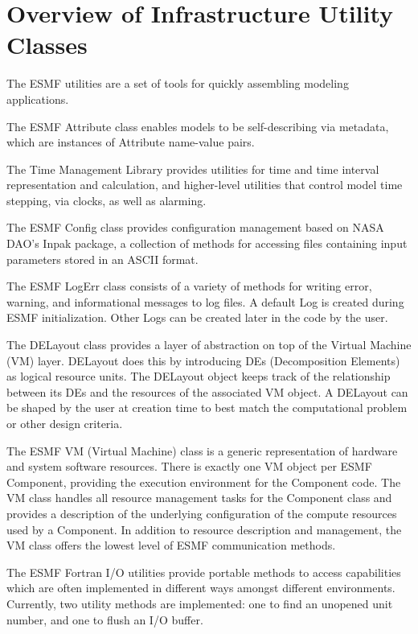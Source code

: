 %

\section{Overview of Infrastructure Utility Classes}

The ESMF utilities are a set of tools for quickly assembling modeling applications.

The ESMF Attribute class enables models to be self-describing via metadata, which are instances of Attribute name-value pairs.

The Time Management Library provides utilities for time and time interval representation and calculation, and higher-level utilities that control model time stepping, via clocks, as well as alarming.

The ESMF Config class provides configuration management based on NASA DAO's Inpak package, a collection of methods for accessing files containing input parameters stored in an ASCII format.

The ESMF LogErr class consists of a variety of methods for writing error, warning, and informational messages to log files. A default Log is created during ESMF initialization. Other Logs can be created later in the code by the user.

The DELayout class provides a layer of abstraction on top of the Virtual Machine (VM) layer. DELayout does this by introducing DEs (Decomposition Elements) as logical resource units. The DELayout object keeps track of the relationship between its DEs and the resources of the associated VM object. A DELayout can be shaped by the user at creation time to best match the computational problem or other design criteria.

The ESMF VM (Virtual Machine) class is a generic representation of hardware and system software resources. There is exactly one VM object per ESMF Component, providing the execution environment for the Component code. The VM class handles all resource management tasks for the Component class and provides a description of the underlying configuration of the compute resources used by a Component.  In addition to resource description and management, the VM class offers the lowest level of ESMF communication methods.

The ESMF Fortran I/O utilities provide portable methods to access capabilities which are often implemented in different ways amongst different environments. Currently, two utility methods are implemented: one to find an unopened unit number, and one to flush an I/O buffer.
